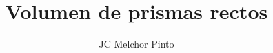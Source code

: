 \documentclass[12pt,addpoints,answers]{guia}
\title{Volumen de prismas rectos}
\author{JC Melchor Pinto}
\begin{document}
\INFO%
\begin{multicols}{2}
    
    
    
\end{multicols}
\begin{questions}
    \questionboxed[10]{}
    \questionboxed[10]{}
    \questionboxed[10]{}
    \questionboxed[10]{}
    \questionboxed[10]{}
    \questionboxed[10]{}
    \questionboxed[10]{}
    \questionboxed[10]{}
    \questionboxed[10]{}
    \questionboxed[10]{}
    \questionboxed[10]{}
    \questionboxed[10]{}
\end{questions}
\end{document}
